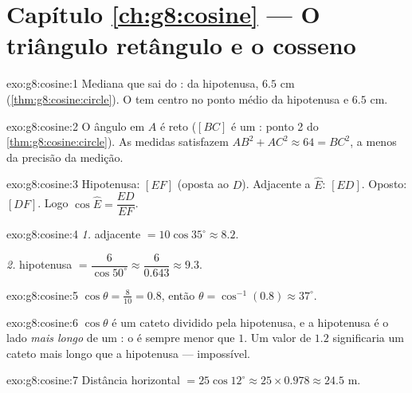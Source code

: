 \section*{Capítulo \ref{ch:g8:cosine} --- O triângulo retângulo e o cosseno}

\begin{solution}{exo:g8:cosine:1}
Mediana que sai do :  da hipotenusa, $6.5$ cm
(\cref{thm:g8:cosine:circle}). O  tem centro no
ponto médio da hipotenusa e  $6.5$ cm.
\end{solution}

\begin{solution}{exo:g8:cosine:2}
O ângulo em $A$ é reto ($[BC]$ é um : ponto 2 do
\cref{thm:g8:cosine:circle}). As medidas satisfazem
$AB^2 + AC^2 \approx 64 = BC^2$, a menos da precisão da medição.
\end{solution}

\begin{solution}{exo:g8:cosine:3}
Hipotenusa: $[EF]$ (oposta ao  $D$). Adjacente a
$\widehat E$: $[ED]$. Oposto: $[DF]$. Logo
$\cos\widehat E = \dfrac{ED}{EF}$.
\end{solution}

\begin{solution}{exo:g8:cosine:4}
\emph{1.} adjacente $= 10 \cos 35^\circ \approx 8.2$.

\emph{2.} hipotenusa $= \dfrac{6}{\cos 50^\circ} \approx
\dfrac{6}{0.643} \approx 9.3$.
\end{solution}

\begin{solution}{exo:g8:cosine:5}
$\cos\theta = \frac{8}{10} = 0.8$, então
$\theta = \cos^{-1}(0.8) \approx 37^\circ$.
\end{solution}

\begin{solution}{exo:g8:cosine:6}
$\cos\theta$ é um cateto dividido pela hipotenusa, e a hipotenusa é o
lado \emph{mais longo} de um : o  é sempre
menor que $1$. Um valor de $1.2$ significaria um cateto mais longo que
a hipotenusa --- impossível.
\end{solution}

\begin{solution}{exo:g8:cosine:7}
Distância horizontal $= 25 \cos 12^\circ \approx 25 \times 0.978
\approx 24.5$ m.
\end{solution}

